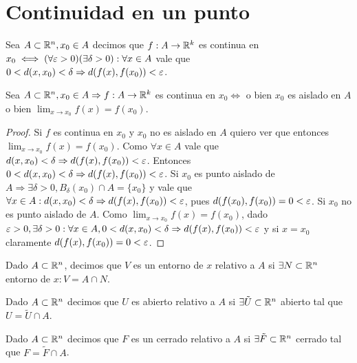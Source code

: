 \section{Continuidad en un punto}

\begin{definition}
  Sea \(A \subset \mathbb{R}^n, x_0 \in A\) decimos que \(f: A \to \mathbb{R}^k\) es continua en \(x_0 \iff (\forall \varepsilon > 0)(\exists \delta > 0) : \forall x \in A\) vale que \(0 < d(x, x_0) < \delta \Rightarrow d(f(x), f(x_0)) < \varepsilon \).
\end{definition}

\begin{lemma}
  Sea \(A \subset \mathbb{R}^n, x_0 \in A \Rightarrow f: A \to \mathbb{R}^k\) es continua en \(x_0 \iff \) o bien \(x_0\) es aislado en \(A\) o bien \(\lim_{x \to x_0} f(x) = f(x_0)\).
  \begin{proof}
    Si \(f\) es continua en \(x_0\) y \(x_0\) no es aislado en \(A\) quiero ver que entonces \(\lim_{x \to x_0} f(x) = f(x_0)\). Como \(\forall x \in A\) vale que \(d(x, x_0) < \delta \Rightarrow d(f(x), f(x_0)) < \varepsilon \). Entonces \(0 < d(x, x_0) < \delta \Rightarrow d(f(x), f(x_0)) < \varepsilon \). Si \(x_0\) es punto aislado de \(A \Rightarrow \exists \delta>0, B_{\delta}(x_0) \cap A =  \{x_0\} \) y vale que \(\forall x \in A : d(x, x_0) < \delta \Rightarrow d(f(x), f(x_0)) < \varepsilon \), pues \(d(f(x_0), f(x_0)) = 0 < \varepsilon \). Si \(x_0\) no es punto aislado de \(A\). Como \(\lim_{x \to x_0} f(x) = f(x_0)\), dado \(\varepsilon > 0, \exists \delta > 0 : \forall x \in A, 0 < d(x, x_0) < \delta \Rightarrow d(f(x), f(x_0)) < \varepsilon \) y si \(x = x_0\) claramente \(d(f(x), f(x_0)) = 0 < \varepsilon \).
  \end{proof}
\end{lemma}

\begin{definition}
  Dado \(A \subset \mathbb{R}^n\), decimos que \(V\) es un entorno de \(x\) relativo a \(A\) si \(\exists N \subset \mathbb{R}^n\) entorno de \(x : V = A \cap N\).
\end{definition}

\begin{definition}
  Dado \(A \subset \mathbb{R}^n\) decimos que \(U\) es abierto relativo a \(A\) si \(\exists \tilde{U} \subset \mathbb{R}^n\) abierto tal que \(U = \tilde{U} \cap A\).
\end{definition}

\begin{definition}
  Dado \(A \subset \mathbb{R}^n\) decimos que \(F\) es un cerrado relativo a \(A\) si \(\exists \tilde{F} \subset \mathbb{R}^n\) cerrado tal que \(F = \tilde{F} \cap A\).
\end{definition}

